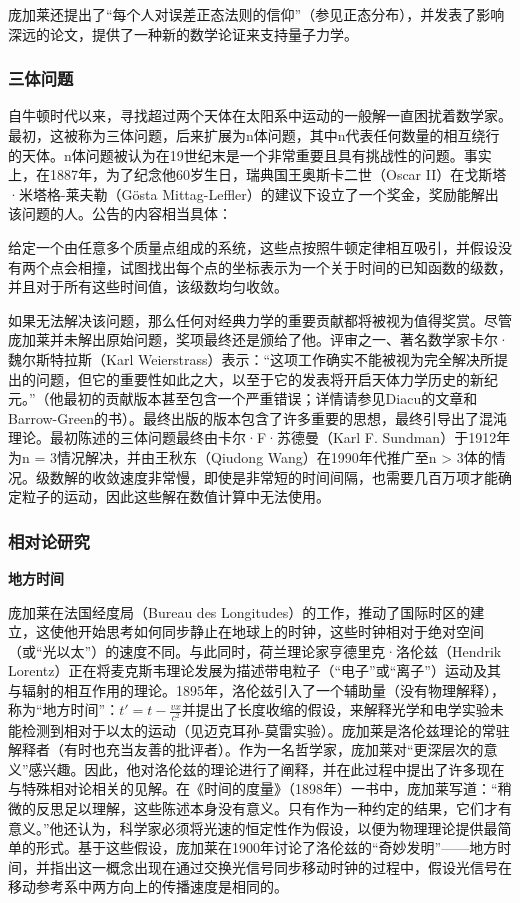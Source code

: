 庞加莱还提出了“每个人对误差正态法则的信仰”（参见正态分布），并发表了影响深远的论文，提供了一种新的数学论证来支持量子力学。
\subsubsection{三体问题}  
自牛顿时代以来，寻找超过两个天体在太阳系中运动的一般解一直困扰着数学家。最初，这被称为三体问题，后来扩展为n体问题，其中n代表任何数量的相互绕行的天体。n体问题被认为在19世纪末是一个非常重要且具有挑战性的问题。事实上，在1887年，为了纪念他60岁生日，瑞典国王奥斯卡二世（Oscar II）在戈斯塔·米塔格-莱夫勒（Gösta Mittag-Leffler）的建议下设立了一个奖金，奖励能解出该问题的人。公告的内容相当具体：

给定一个由任意多个质量点组成的系统，这些点按照牛顿定律相互吸引，并假设没有两个点会相撞，试图找出每个点的坐标表示为一个关于时间的已知函数的级数，并且对于所有这些时间值，该级数均匀收敛。

如果无法解决该问题，那么任何对经典力学的重要贡献都将被视为值得奖赏。尽管庞加莱并未解出原始问题，奖项最终还是颁给了他。评审之一、著名数学家卡尔·魏尔斯特拉斯（Karl Weierstrass）表示：“这项工作确实不能被视为完全解决所提出的问题，但它的重要性如此之大，以至于它的发表将开启天体力学历史的新纪元。”（他最初的贡献版本甚至包含一个严重错误；详情请参见Diacu的文章和Barrow-Green的书）。最终出版的版本包含了许多重要的思想，最终引导出了混沌理论。最初陈述的三体问题最终由卡尔·F·苏德曼（Karl F. Sundman）于1912年为n = 3情况解决，并由王秋东（Qiudong Wang）在1990年代推广至n > 3体的情况。级数解的收敛速度非常慢，即使是非常短的时间间隔，也需要几百万项才能确定粒子的运动，因此这些解在数值计算中无法使用。
\subsubsection{相对论研究}
\textbf{地方时间}

庞加莱在法国经度局（Bureau des Longitudes）的工作，推动了国际时区的建立，这使他开始思考如何同步静止在地球上的时钟，这些时钟相对于绝对空间（或“光以太”）的速度不同。与此同时，荷兰理论家亨德里克·洛伦兹（Hendrik Lorentz）正在将麦克斯韦理论发展为描述带电粒子（“电子”或“离子”）运动及其与辐射的相互作用的理论。1895年，洛伦兹引入了一个辅助量（没有物理解释），称为“地方时间”：\(t' = t - \frac{vx}{c^2}\)并提出了长度收缩的假设，来解释光学和电学实验未能检测到相对于以太的运动（见迈克耳孙-莫雷实验）。庞加莱是洛伦兹理论的常驻解释者（有时也充当友善的批评者）。作为一名哲学家，庞加莱对“更深层次的意义”感兴趣。因此，他对洛伦兹的理论进行了阐释，并在此过程中提出了许多现在与特殊相对论相关的见解。在《时间的度量》（1898年）一书中，庞加莱写道：“稍微的反思足以理解，这些陈述本身没有意义。只有作为一种约定的结果，它们才有意义。”他还认为，科学家必须将光速的恒定性作为假设，以便为物理理论提供最简单的形式。基于这些假设，庞加莱在1900年讨论了洛伦兹的“奇妙发明”——地方时间，并指出这一概念出现在通过交换光信号同步移动时钟的过程中，假设光信号在移动参考系中两方向上的传播速度是相同的。